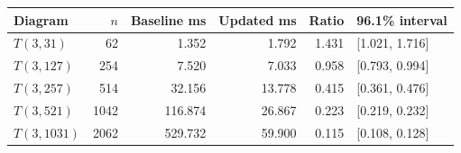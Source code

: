 \begin{tabular}{lrrrrl}
\toprule
Diagram & $n$ & Baseline ms & Updated ms & Ratio & 96.1\% interval \\
\midrule
$T(3,31)$ & 62 & 1.352 & 1.792 & 1.431 & [1.021, 1.716] \\
$T(3,127)$ & 254 & 7.520 & 7.033 & 0.958 & [0.793, 0.994] \\
$T(3,257)$ & 514 & 32.156 & 13.778 & 0.415 & [0.361, 0.476] \\
$T(3,521)$ & 1042 & 116.874 & 26.867 & 0.223 & [0.219, 0.232] \\
$T(3,1031)$ & 2062 & 529.732 & 59.900 & 0.115 & [0.108, 0.128] \\
\bottomrule
\end{tabular}
